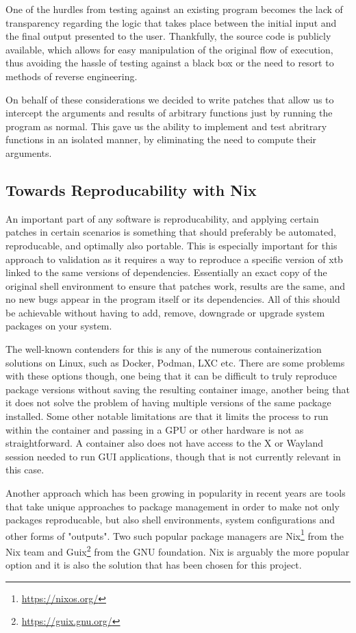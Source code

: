 One of the hurdles from testing against an existing program becomes the lack of transparency regarding the logic that takes place between the initial input and the final output presented to the user. Thankfully, the source code is publicly available, which allows for easy manipulation of the original flow of execution, thus avoiding the hassle of testing against a black box or the need to resort to methods of reverse engineering.

On behalf of these considerations we decided to write patches that allow us to intercept the arguments and results of arbitrary functions just by running the program as normal. This gave us the ability to implement and test abritrary functions in an isolated manner, by eliminating the need to compute their arguments.

\subsection{Towards Reproducability with Nix}

An important part of any software is reproducability, and applying certain patches in certain scenarios is something that should preferably be automated, reproducable, and optimally also portable. This is especially important for this approach to validation as it requires a way to reproduce a specific version of xtb linked to the same versions of dependencies. Essentially an exact copy of the original shell environment to ensure that patches work, results are the same, and no new bugs appear in the program itself or its dependencies. All of this should be achievable without having to add, remove, downgrade or upgrade system packages on your system.

The well-known contenders for this is any of the numerous containerization solutions on Linux, such as Docker, Podman, LXC etc. There are some problems with these options though, one being that it can be difficult to truly reproduce package versions without saving the resulting container image, another being that it does not solve the problem of having multiple versions of the same package installed. Some other notable limitations are that it limits the process to run within the container and passing in a GPU or other hardware is not as straightforward. A container also does not have access to the X or Wayland session needed to run GUI applications, though that is not currently relevant in this case.

Another approach which has been growing in popularity in recent years are tools that take unique approaches to package management in order to make not only packages reproducable, but also shell environments, system configurations and other forms of "outputs". Two such popular package managers are Nix\footnote{\url{https://nixos.org/}} from the Nix team and Guix\footnote{\url{https://guix.gnu.org/}} from the GNU foundation. Nix is arguably the more popular option and it is also the solution that has been chosen for this project.

